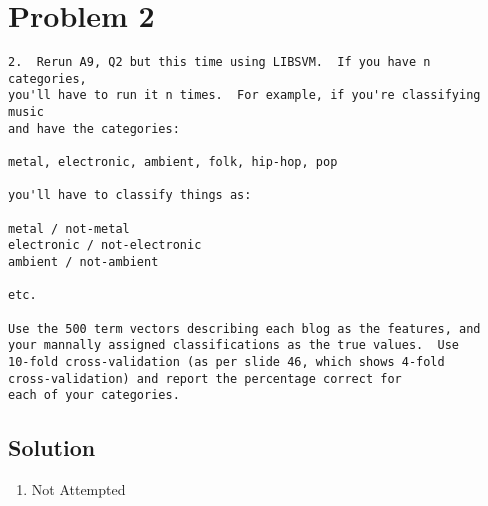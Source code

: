 

\section{Problem 2}
\label{part2}
\begin{verbatim}
2.  Rerun A9, Q2 but this time using LIBSVM.  If you have n categories,
you'll have to run it n times.  For example, if you're classifying music
and have the categories:

metal, electronic, ambient, folk, hip-hop, pop

you'll have to classify things as:

metal / not-metal
electronic / not-electronic
ambient / not-ambient

etc.

Use the 500 term vectors describing each blog as the features, and
your mannally assigned classifications as the true values.  Use
10-fold cross-validation (as per slide 46, which shows 4-fold
cross-validation) and report the percentage correct for 
each of your categories.

\end{verbatim}

\subsection{Solution}
\begin{enumerate}
\item Not Attempted
\end{enumerate}
\newpage
